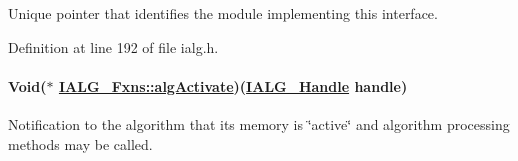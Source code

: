 Unique pointer that identifies the module implementing this interface. 



Definition at line 192 of file ialg.h.\hypertarget{struct_i_a_l_g___fxns_f1213efc8ac6fdfb72b50da9950baaa7}{
\paragraph[algActivate]{\setlength{\rightskip}{0pt plus 5cm}Void($\ast$ \hyperlink{struct_i_a_l_g___fxns_f1213efc8ac6fdfb72b50da9950baaa7}{IALG\_\-Fxns::alg\-Activate})(\hyperlink{struct_i_a_l_g___obj}{IALG\_\-Handle} handle)}\hfill}
\label{struct_i_a_l_g___fxns_f1213efc8ac6fdfb72b50da9950baaa7}


Notification to the algorithm that its memory is \char`\"{}active\char`\"{} and algorithm processing methods may be called. 

